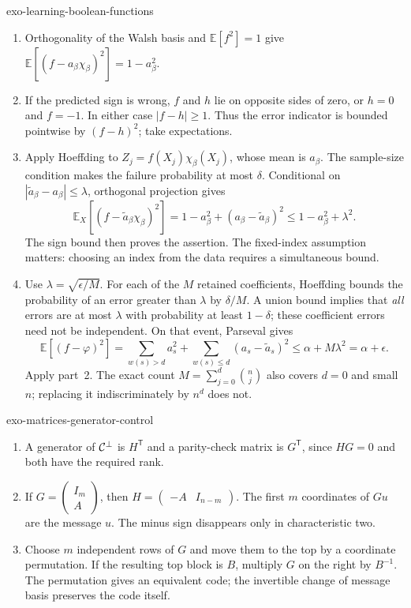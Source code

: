 \begin{correction}{exo-learning-boolean-functions}
\begin{enumerate}
\item Orthogonality of the Walsh basis and $\mathbb E[f^2]=1$ give
$\mathbb E[(f-a_\beta\chi_\beta)^2]=1-a_\beta^2$.
\item If the predicted sign is wrong, $f$ and $h$ lie on opposite
sides of zero, or $h=0$ and $f=-1$. In either case $|f-h|\geq1$.
Thus the error indicator is bounded pointwise by $(f-h)^2$; take expectations.
\item Apply Hoeffding to $Z_j=f(X_j)\chi_\beta(X_j)$, whose mean is
$a_\beta$. The sample-size condition makes the failure probability at
most $\delta$. Conditional on $|\widetilde a_\beta-a_\beta|\leq\lambda$,
orthogonal projection gives
\[
 \mathbb E_X[(f-\widetilde a_\beta\chi_\beta)^2]
   =1-a_\beta^2+(a_\beta-\widetilde a_\beta)^2
   \leq1-a_\beta^2+\lambda^2.
\]
The sign bound then proves the assertion. The fixed-index assumption
matters: choosing an index from the data requires a simultaneous bound.
\item Use $\lambda=\sqrt{\epsilon/M}$. For each of the $M$ retained
coefficients, Hoeffding bounds the probability of an error greater than
$\lambda$ by $\delta/M$. A union bound implies that \emph{all} errors
are at most $\lambda$ with probability at least $1-\delta$; these
coefficient errors need not be independent. On that event, Parseval gives
\[
 \mathbb E[(f-\varphi)^2]=\sum_{w(s)>d}a_s^2+
            \sum_{w(s)\leq d}(a_s-\widetilde a_s)^2
       \leq\alpha+M\lambda^2=\alpha+\epsilon.
\]
Apply part~2. The exact count $M=\sum_{j=0}^d\binom nj$ also covers
$d=0$ and small $n$; replacing it indiscriminately by $n^d$ does not.
\end{enumerate}
\end{correction}

\begin{correction}{exo-matrices-generator-control}
\begin{enumerate}
\item A generator of $\mathcal{C}^\bot$ is $H^{\mathsf T}$ and a parity-check
matrix is $G^{\mathsf T}$, since $HG=0$ and both have the required rank.
\item If $G=\begin{pmatrix}I_m\\A\end{pmatrix}$, then
$H=\begin{pmatrix}-A&I_{n-m}\end{pmatrix}$. The first $m$ coordinates
of $Gu$ are the message $u$. The minus sign disappears only in
characteristic two.
\item Choose $m$ independent rows of $G$ and move them to the top by
a coordinate permutation. If the resulting top block is $B$, multiply
$G$ on the right by $B^{-1}$. The permutation gives an equivalent code;
the invertible change of message basis preserves the code itself.
\end{enumerate}
\end{correction}

